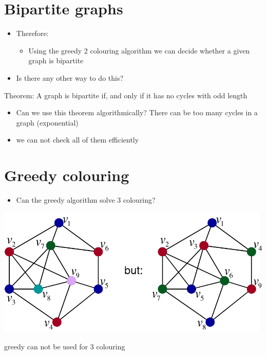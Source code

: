 \documentclass{article}[18pt]
\begin{document}
\section{Bipartite graphs}
\begin{itemize}
	\item Therefore:
	\begin{itemize}
		\item Using the greedy 2 colouring algorithm we can decide whether a given graph is bipartite
	\end{itemize}
	\item Is there any other way to do this?
\end{itemize}
Theorem: A graph is bipartite if, and only if it has no cycles with odd length
\begin{itemize}
	\item Can we use this theorem algorithmically? There can be too many cycles in a graph (exponential)
	\item we can not check all of them efficiently
\end{itemize}
\section{Greedy colouring}
\begin{itemize}
	\item Can the greedy algorithm solve 3 colouring?
\end{itemize}
\begin{center}
	\includegraphics[scale=0.7]{3_colour}
\end{center}
greedy can not be used for 3 colouring
\end{document}
